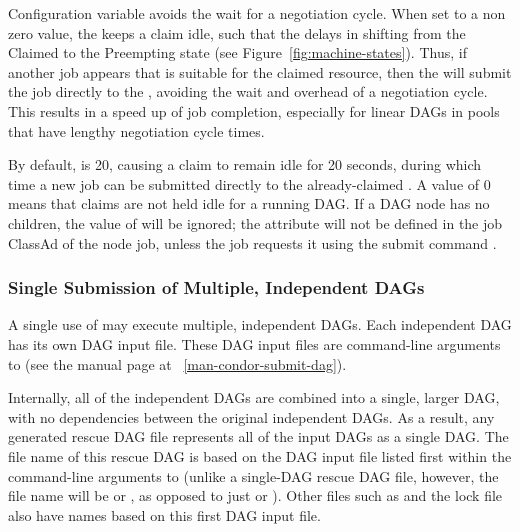 Configuration variable
avoids the wait for a negotiation cycle.
When set to a non zero value, 
the  keeps a claim idle,
such that the  delays in shifting from
the Claimed to the Preempting state (see Figure~\ref{fig:machine-states}).
Thus, if another job appears that is suitable for the claimed resource,
then the  will submit the job directly to the , 
avoiding the wait and overhead of a negotiation cycle.
This results in a speed up of job completion,
especially for linear DAGs in pools that have lengthy negotiation cycle times.

By default,  is 20, 
causing a claim to remain idle for 20 seconds, 
during which time a new job can be submitted
directly to the already-claimed . 
A value of 0 means that claims are not held idle for a running DAG.
If a DAG node has no children,
the value of  will be ignored;
the  attribute will not be defined in the job ClassAd 
of the node job, unless the job requests it using the submit command
. 

\subsubsection{\label{sec:MultipleDAGs}Single Submission of Multiple, Independent DAGs}

A single use of  may execute multiple, independent DAGs.
Each independent DAG has its own DAG input file.
These DAG input files are command-line arguments to
(see the  manual page at ~\ref{man-condor-submit-dag}).

Internally, all of the independent DAGs are combined
into a single, larger DAG, with no dependencies between
the original independent DAGs.
As a result,
any generated rescue DAG file represents all of the input DAGs
as a single DAG.
The file name of this rescue DAG is based on the DAG input file
listed first within the command-line arguments to
 (unlike a single-DAG rescue DAG file, however,
the file name will be
 or
,
as opposed to
just 
or ).
Other files such
as  and the lock file also have names based on this
first DAG input file.

